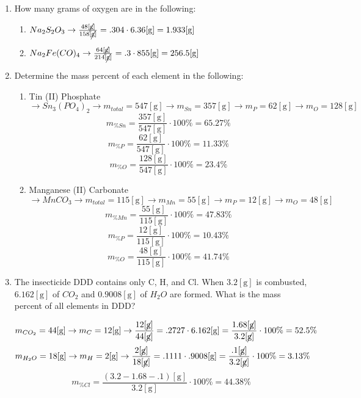 \documentclass[12pt]{article}
\begin{document}
\begin{enumerate}
\begin{enumerate}
    \end{enumerate}

  \item How many grams of oxygen are in the following:

    \begin{enumerate}

      \item $Na_2S_2O_3\rightarrow\frac{48[\cancel{\si{\gram}}]}{158[\cancel{\si{\gram}}]}=.304\cdot6.36[\si{\gram}]=1.933[\si{\gram}]$

      \item $Na_2Fe(CO)_4\rightarrow\frac{64[\cancel{\si{\gram}}]}{214[\cancel{\si{\gram}}]}=.3\cdot855[\si{\gram}]=256.5[\si{\gram}]$

    \end{enumerate}

  \item Determine the mass percent of each element in the following:

    \begin{enumerate}

      \item Tin (II) Phosphate $\rightarrow Sn_3(PO_4)_2 \rightarrow m_{total}=547[\si{\gram}]\rightarrow m_{Sn}=357[\si{\gram}]\rightarrow m_P=62[\si{\gram}]\rightarrow m_O=128[\si{\gram}]$
        $$m_{\% Sn}=\frac{357[\si{\gram}]}{547[\si{\gram}]}\cdot100\%=65.27\%$$
        $$m_{\% P}=\frac{62[\si{\gram}]}{547[\si{\gram}]}\cdot100\%=11.33\%$$
        $$m_{\% O}=\frac{128[\si{\gram}]}{547[\si{\gram}]}\cdot100\%=23.4\%$$

      \item Manganese (II) Carbonate $\rightarrow MnCO_3 \rightarrow m_{total}=115[\si{\gram}]\rightarrow m_{Mn}=55[\si{\gram}]\rightarrow m_P=12[\si{\gram}]\rightarrow m_O=48[\si{\gram}]$
        $$m_{\% Mn}=\frac{55[\si{\gram}]}{115[\si{\gram}]}\cdot100\%=47.83\%$$
        $$m_{\% P}=\frac{12[\si{\gram}]}{115[\si{\gram}]}\cdot100\%=10.43\%$$
        $$m_{\% O}=\frac{48[\si{\gram}]}{115[\si{\gram}]}\cdot100\%=41.74\%$$
        

    \end{enumerate}

  \item The insecticide DDD contains only C, H, and Cl. When $3.2[\si{\gram}]$ is combusted, $6.162[\si{\gram}]$ of $CO_2$ and $0.9008[\si{\gram}]$ of $H_2O$ are formed. What is the mass percent of all elements in DDD?

    $$m_{CO_2}=44[\si{\gram}]\rightarrow m_C=12[\si{\gram}]\rightarrow\frac{12[\cancel{\si{\gram}}]}{44[\cancel{\si{\gram}}]}=.2727\cdot6.162[\si{\gram}]=\frac{1.68[\cancel{\si{\gram}}]}{3.2[\cancel{\si{\gram}}]}\cdot100\%=52.5\%$$
    $$m_{H_2O}=18[\si{\gram}]\rightarrow m_H=2[\si{\gram}]\rightarrow\frac{2[\cancel{\si{\gram}}]}{18[\cancel{\si{\gram}}]}=.1111\cdot.9008[\si{\gram}]=\frac{.1[\cancel{\si{\gram}}]}{3.2[\cancel{\si{\gram}}]}\cdot100\%=3.13\%$$
    $$m_{\% Cl}=\frac{(3.2-1.68-.1)[\si{\gram}]}{3.2[\si{\gram}]}\cdot100\%=44.38\%$$



\end{enumerate}
\end{document}
